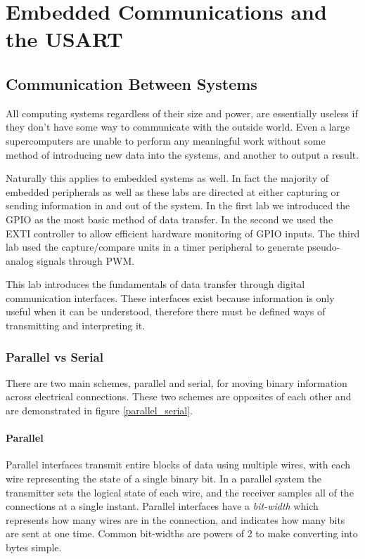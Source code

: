 \documentclass[11pt,fleqn]{book} %
\begin{document}
	
\chapter{Embedded Communications and the USART}

\section{Communication Between Systems}
All computing systems regardless of their size and power, are essentially useless if they don't have some way to communicate with the outside world. Even a large supercomputers are unable to perform any meaningful work without some method of introducing new data into the systems, and another to output a result. 

Naturally this applies to embedded systems as well. In fact the majority of embedded peripherals as well as these labs are directed at either capturing or sending information in and out of the system. In the first lab we introduced the GPIO as the most basic method of data transfer. In the second we used the EXTI controller to allow efficient hardware monitoring of GPIO inputs. The third lab used the capture/compare units in a timer peripheral to generate pseudo-analog signals through PWM. 

This lab introduces the fundamentals of data transfer through digital communication interfaces. These interfaces exist because information is only useful when it can be understood, therefore there must be defined ways of transmitting and interpreting it.

\subsection{Parallel vs Serial}

There are two main schemes, parallel and serial, for moving binary information across electrical connections. These two schemes are opposites of each other and are demonstrated in figure \ref{parallel_serial}. 

\subsubsection{Parallel}
Parallel interfaces transmit entire blocks of data using multiple wires, with each wire representing the state of a single binary bit. In a parallel system the transmitter sets the logical state of each wire, and the receiver samples all of the connections at a single instant. Parallel interfaces have a \textit{bit-width} which represents how many wires are in the connection, and indicates how many bits are sent at one time. Common bit-widths are powers of 2 to make converting into bytes simple. 
\end{document}
